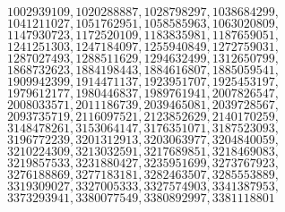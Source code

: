 $ 1002939109, 1020288887, 1028798297, 1038684299, $
$ 1041211027, 1051762951, 1058585963, 1063020809, $
$ 1147930723, 1172520109, 1183835981, 1187659051, $
$ 1241251303, 1247184097, 1255940849, 1272759031, $
$ 1287027493, 1288511629, 1294632499, 1312650799, $
$ 1868732623, 1884198443, 1884616807, 1885059541, $
$ 1909942399, 1914471137, 1923951707, 1925453197, $
$ 1979612177, 1980446837, 1989761941, 2007826547, $
$ 2008033571, 2011186739, 2039465081, 2039728567, $
$ 2093735719, 2116097521, 2123852629, 2140170259, $
$ 3148478261, 3153064147, 3176351071, 3187523093, $
$ 3196772239, 3201312913, 3203063977, 3204840059, $
$ 3210224309, 3213032591, 3217689851, 3218469083, $
$ 3219857533, 3231880427, 3235951699, 3273767923, $
$ 3276188869, 3277183181, 3282463507, 3285553889, $
$ 3319309027, 3327005333, 3327574903, 3341387953, $
$ 3373293941, 3380077549, 3380892997, 3381118801  $
